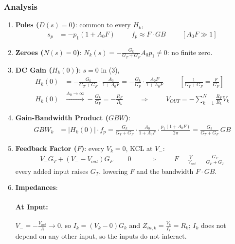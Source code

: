 \subsubsection{Analysis}
\begin{enumerate}
  \item \textbf{Poles (\(D(s) = 0\))}: common to every \(H_k\),
    \begin{align*}
      s_p &= -p_1(1 + A_0 F) \hspace{1cm} f_p \approx F \cdot GB \hspace{1cm} [A_0 F \gg 1]
    \end{align*}
  \item \textbf{Zeroes (\(N(s) = 0\))}: \(N_k(s) = -\frac{G_k}{G_T + G_F} A_0 p_1 \neq 0\): no finite zero.
  \item \textbf{DC Gain (\(H_k(0)\))}: \(s = 0\) in (3),
    \begin{align*}
      H_k(0) &= -\frac{G_k}{G_T + G_F}\cdot\frac{A_0}{1 + A_0 F} = -\frac{G_k}{G_F}\cdot\frac{A_0 F}{1 + A_0 F} \hspace{1cm} \left[\tfrac{1}{G_T + G_F} = \tfrac{F}{G_F}\right] \\
      H_k(0) &\xrightarrow{A_0 \to \infty} -\frac{G_k}{G_F} = -\frac{R_F}{R_k}
      \hspace{1cm} \Rightarrow \hspace{1cm} V_{OUT} = -\sum_{k=1}^{N} \frac{R_F}{R_k} V_k
    \end{align*}
  \item \textbf{Gain-Bandwidth Product (\(GBW\))}:
    \begin{align*}
      GBW_k &= |H_k(0)| \cdot f_p = \frac{G_k}{G_T + G_F}\cdot\frac{A_0}{1 + A_0 F}\cdot\frac{p_1(1 + A_0 F)}{2\pi} = \frac{G_k}{G_T + G_F}\, GB
    \end{align*}
  \item \textbf{Feedback Factor (\(F\))}: every \(V_k = 0\), KCL at \(V_-\):
    \begin{align*}
      V_- G_T + (V_- - V_{out}) G_F &= 0 \hspace{1cm} \Rightarrow \hspace{1cm} F = \frac{V_-}{V_{out}} = \frac{G_F}{G_F + G_T}
    \end{align*}
    every added input raises \(G_T\), lowering \(F\) and the bandwidth \(F \cdot GB\).
  \item \textbf{Impedances}:
    \paragraph{At Input:} \(V_- = -\frac{V_{out}}{A} \to 0\), so
    \(I_k = (V_k - 0) G_k\) and \(Z_{in,k} = \frac{V_k}{I_k} = R_k\); \(I_k\) does not depend on
    any other input, so the inputs do not interact.

\end{enumerate}
